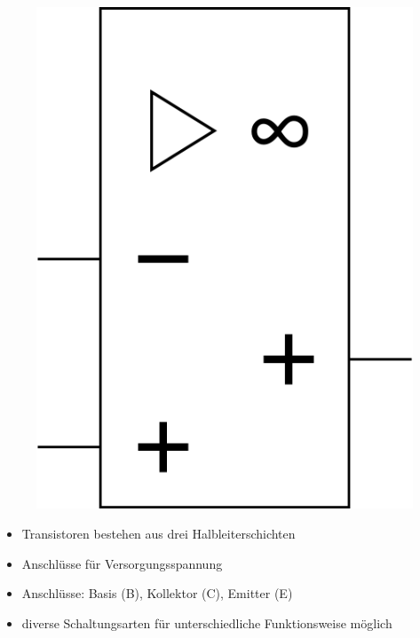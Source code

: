 \begin{frame}
\begin{minipage}{0.4\textwidth}
\begin{figure}
      \includegraphics[width=\textwidth,height=.5\textheight,keepaspectratio]{e13/OPV-ger.png}
    \end{figure}
\end{minipage}
\begin{center}
\begin{itemize}
      \item Transistoren bestehen aus drei Halbleiterschichten
      \item Anschlüsse für Versorgungsspannung
      \item Anschlüsse: Basis (B), Kollektor (C), Emitter (E)
      \item diverse Schaltungsarten für unterschiedliche Funktionsweise möglich
\end{itemize}
\end{center}
\end{frame}

